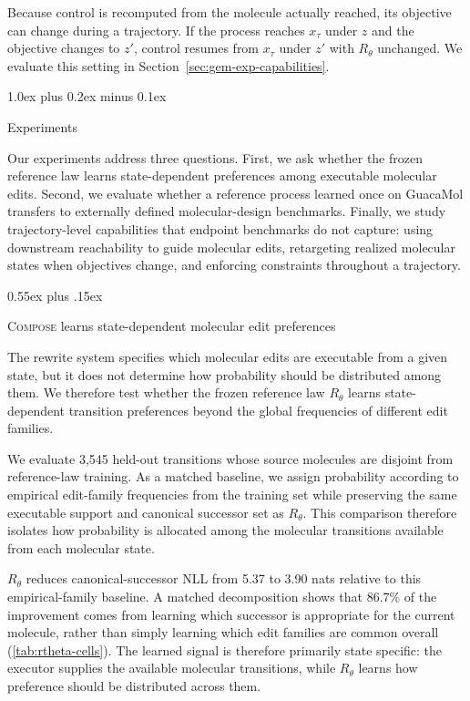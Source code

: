 \documentclass{article}
\makeatletter
\theoremstyle{definition}
\theoremstyle{remark}
\newcommand{\method}{\textsc{Compose}\xspace}
\def\section{\@startsection{section}{1}{\z@}{-1.4ex plus -0.4ex minus -.2ex}%
  {1.0ex plus 0.2ex minus 0.1ex}{\large\sc\raggedright}}
\def\subsection{\@startsection{subsection}{2}{\z@}{-1.2ex plus -0.4ex minus -.2ex}%
  {0.55ex plus .15ex}{\normalsize\sc\raggedright}}
\makeatother
\begin{document}
Because control is recomputed from the molecule actually reached, its objective
can change during a trajectory. If the process reaches $x_\tau$ under $z$ and the
objective changes to $z'$, control resumes from $x_\tau$ under $z'$ with
$R_\theta$ unchanged. We evaluate this setting in
Section~\ref{sec:gem-exp-capabilities}.

\section{Experiments}
\label{sec:gem-experiments}

Our experiments address three questions. First, we ask whether the frozen reference
law learns state-dependent preferences among executable molecular edits. Second,
we evaluate whether a reference process learned once on GuacaMol transfers 
to externally defined molecular-design benchmarks. Finally, we study
trajectory-level capabilities that endpoint benchmarks do not capture: using
downstream reachability to guide molecular edits, retargeting realized molecular
states when objectives change, and enforcing constraints throughout a
trajectory.

\subsection{\method{} learns state-dependent molecular edit preferences}
\label{sec:gem-exp-rtheta}

The rewrite system specifies which molecular edits are executable from a given
state, but it does not determine how probability should be distributed among
them. We therefore test whether the frozen reference law $R_\theta$ learns
state-dependent transition preferences beyond the global frequencies of
different edit families.

We evaluate 3{,}545 held-out transitions whose source molecules are disjoint
from reference-law training. As a matched baseline, we assign probability
according to empirical edit-family frequencies from the training set while
preserving the same executable support and canonical successor set as
$R_\theta$. This comparison therefore isolates how probability is allocated among
the molecular transitions available from each molecular state.

$R_\theta$ reduces canonical-successor NLL from 5.37 to 3.90 nats relative to
this empirical-family baseline. A matched decomposition shows that 86.7\% of the
improvement comes from learning which successor is appropriate for the current
molecule, rather than simply learning which edit families are common overall
(\cref{tab:rtheta-cells}). The learned signal is therefore primarily state
specific: the executor supplies the available molecular transitions, while
$R_\theta$ learns how preference should be distributed across them.
\end{document}
